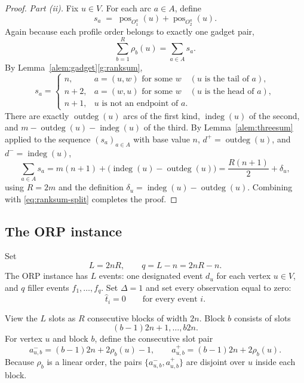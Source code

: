 \documentclass[11pt]{article}
\newcommand{\indeg}{\operatorname{indeg}}
\newcommand{\pos}{\operatorname{pos}}
\newcommand{\outdeg}{\operatorname{outdeg}}
\begin{document}
\begin{proof}
\emph{Part (ii).}  Fix $u\in V$.  For each arc $a\in A$, define
\begin{equation}
  s_a \;=\; \pos_{O_1^a}(u)+\pos_{O_2^a}(u).
\end{equation}
Again because each profile order belongs to exactly one gadget pair,
\begin{equation}\label{eq:ranksum-split}
  \sum_{b=1}^R\rho_b(u)=\sum_{a\in A}s_a .
\end{equation}
By Lemma~\ref{alem:gadget}\ref{g:ranksum},
\begin{equation}
  s_a=
  \begin{cases}
    n, & a=(u,w)\text{ for some }w \quad(\text{$u$ is the tail of }a),\\
    n+2, & a=(w,u)\text{ for some }w \quad(\text{$u$ is the head of }a),\\
    n+1, & u\text{ is not an endpoint of }a.
  \end{cases}
\end{equation}
There are exactly $\outdeg(u)$ arcs of the first kind, $\indeg(u)$ of the second, and $m-\outdeg(u)-\indeg(u)$ of the third.  By Lemma~\ref{alem:threesum} applied to the sequence $(s_a)_{a\in A}$ with base value $n$, $d^+=\outdeg(u)$, and $d^-=\indeg(u)$,
\begin{equation}
  \sum_{a\in A}s_a=m(n+1)+\bigl(\indeg(u)-\outdeg(u)\bigr)=\frac{R(n+1)}2+\delta_u,
\end{equation}
using $R=2m$ and the definition $\delta_u=\indeg(u)-\outdeg(u)$.  Combining with \eqref{eq:ranksum-split} completes the proof.
\end{proof}

\subsection{The ORP instance}

Set
\begin{equation}
  L=2nR,
  \qquad q=L-n=2nR-n.
\end{equation}
The ORP instance has $L$ events: one designated event $d_u$ for each vertex $u\in V$, and $q$ filler events $f_1,
\ldots,f_q$.  Set $\Delta=1$ and set every observation equal to zero:
\begin{equation}
  \hat t_i=0\qquad\text{for every event }i.
\end{equation}

View the $L$ slots as $R$ consecutive blocks of width $2n$.  Block $b$ consists of slots
\begin{equation}
  (b-1)2n+1,\ldots,b2n.
\end{equation}
For vertex $u$ and block $b$, define the consecutive slot pair
\begin{equation}
  a_{u,b}^-=(b-1)2n+2\rho_b(u)-1,
  \qquad
  a_{u,b}^+=(b-1)2n+2\rho_b(u).
\end{equation}
Because $\rho_b$ is a linear order, the pairs $\{a_{u,b}^-,a_{u,b}^+\}$ are disjoint over $u$ inside each block.
\end{document}

